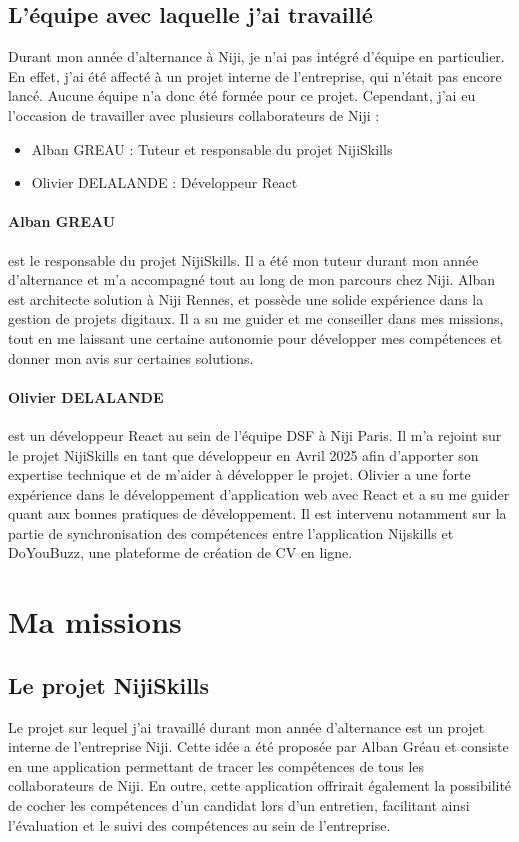 \documentclass[12pt]{article}
\begin{document}
\subsection{L'équipe avec laquelle j'ai travaillé}
Durant mon année d'alternance à Niji, je n'ai pas intégré d'équipe en particulier. En effet, j'ai été affecté à un projet interne de l'entreprise, qui n'était pas encore lancé. Aucune équipe n'a donc été formée pour ce projet. Cependant, j'ai eu l'occasion de travailler avec plusieurs collaborateurs de Niji :
\newline
\begin{itemize}
    \item Alban GREAU : Tuteur et responsable du projet NijiSkills
    \item Olivier DELALANDE : Développeur React
\end{itemize}
\paragraph{Alban GREAU} est le responsable du projet NijiSkills. Il a été mon tuteur durant mon année d'alternance et m'a accompagné tout au long de mon parcours chez Niji. Alban est architecte solution à Niji Rennes, et possède une solide expérience dans la gestion de projets digitaux. Il a su me guider et me conseiller dans mes missions, tout en me laissant une certaine autonomie pour développer mes compétences et donner mon avis sur certaines solutions.
\paragraph{Olivier DELALANDE} est un développeur React au sein de l'équipe DSF à Niji Paris. Il m'a rejoint sur le projet NijiSkills en tant que développeur en Avril 2025 afin d'apporter son expertise technique et de m'aider à développer le projet. Olivier a une forte expérience dans le développement d'application web avec React et a su me guider quant aux bonnes pratiques de développement. Il est intervenu notamment sur la partie de synchronisation des compétences entre l'application Nijskills et DoYouBuzz, une plateforme de création de CV en ligne.
\newpage
\section{Ma missions}
\subsection{Le projet NijiSkills}
Le projet sur lequel j'ai travaillé durant mon année d'alternance est un projet interne de l'entreprise Niji. Cette idée a été proposée par Alban Gréau et consiste en une application permettant de tracer les compétences de tous les collaborateurs de Niji. En outre, cette application offrirait également la possibilité de cocher les compétences d'un candidat lors d'un entretien, facilitant ainsi l'évaluation et le suivi des compétences au sein de l'entreprise.
\end{document}
